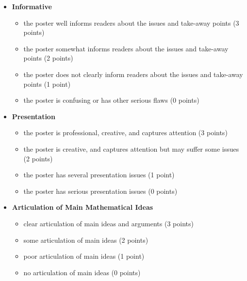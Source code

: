 \documentclass[11pt,letterpaper]{article}
\begin{document}
\begin{itemize}
\item  \textbf{Informative}
\begin{itemize}
\item[\underline{\hspace{.2in}}] the poster well informs readers about the issues and take-away points (3 points) 
\item[\underline{\hspace{.2in}}] the poster somewhat informs readers about the issues and take-away points (2 points) 
\item[\underline{\hspace{.2in}}] the poster does not clearly inform readers about the issues and take-away points (1 point) 
\item[\underline{\hspace{.2in}}] the poster is confusing or has other serious flaws (0 points) 
\end{itemize}

\item  \textbf{Presentation}
\begin{itemize}
\item[\underline{\hspace{.2in}}] the poster is professional, creative, and captures attention (3 points)
\item[\underline{\hspace{.2in}}] the poster is creative, and captures attention but may suffer some issues (2 points)
\item[\underline{\hspace{.2in}}] the poster has several presentation issues (1 point)
\item[\underline{\hspace{.2in}}] the poster has serious presentation issues (0 points)
\end{itemize}

\item  \textbf{Articulation of Main Mathematical Ideas}
\begin{itemize}
\item[\underline{\hspace{.2in}}]  clear articulation of main ideas and arguments (3 points)
\item[\underline{\hspace{.2in}}] some articulation of main ideas (2 points)
\item[\underline{\hspace{.2in}}]  poor articulation of main ideas (1 point)
\item[\underline{\hspace{.2in}}] no articulation of main ideas (0 points)
\end{itemize}


\end{itemize}
\end{document}
